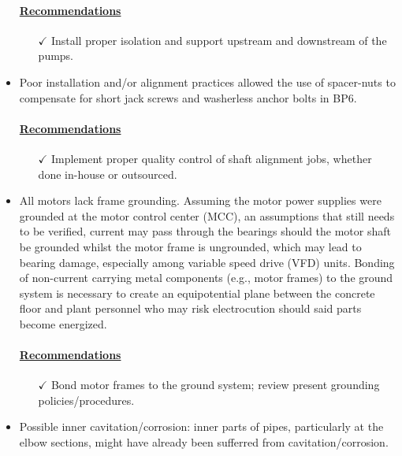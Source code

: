 \begin{itemize}
\paragraph{\underline{Recommendations}}
\begin{itemize}
	\item [$\checkmark$] Install proper isolation and support upstream and downstream of the pumps. 
\end{itemize}

\item Poor installation and/or alignment practices allowed the use of spacer-nuts to compensate for short jack screws and washerless anchor bolts in BP6.

\paragraph{\underline{Recommendations}}
\begin{itemize}
	\item [$\checkmark$] Implement proper quality control of shaft alignment jobs, whether done in-house or outsourced. 
\end{itemize}

\item All motors lack frame grounding. Assuming the motor power supplies were grounded at the motor control center (MCC), an assumptions that still needs to be verified, current may pass through the bearings should the motor shaft be grounded whilst the motor frame is ungrounded, which may lead to bearing damage, especially among variable speed drive (VFD) units. Bonding of non-current carrying metal components (e.g., motor frames) to the ground system is necessary to create an equipotential plane between the concrete floor and plant personnel who may risk electrocution should said parts become energized.

\paragraph{\underline{Recommendations}}
\begin{itemize}
	\item [$\checkmark$] Bond motor frames to the ground system; review present grounding policies/procedures.  
\end{itemize}


\item Possible inner cavitation/corrosion: inner parts of pipes, particularly at the elbow sections, might have already been sufferred from cavitation/corrosion. 


\end{itemize}
